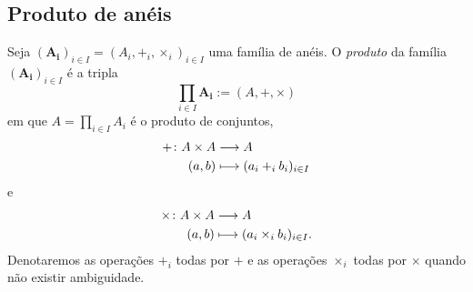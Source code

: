 \subsection{Produto de anéis}

\begin{definition}
Seja $(\bm{A_i})_{i \in I}=(A_i,+_i,\times_i)_{i \in I}$ uma família de anéis. O \emph{produto} da família $(\bm{A_i})_{i \in I}$ é a tripla
	\begin{equation*}
	\prod_{i \in I} \bm{A_i} := (A,+,\times)
	\end{equation*}
em que $A = \prod_{i \in I} A_i$ é o produto de conjuntos,
	\begin{align*}
	{+}\colon {A \times A} &\longrightarrow {A} \\{(a,b)} &\longmapsto (a_i +_i b_i)_{i \in I}
	\end{align*}
e
	\begin{align*}
	{\times}\colon {A \times A} &\longrightarrow {A} \\{(a,b)} &\longmapsto (a_i \times_i b_i)_{i \in I}.
	\end{align*}
Denotaremos as operações $+_i$ todas por $+$ e as operações $\times_i$ todas por $\times$ quando não existir ambiguidade.
\end{definition}

